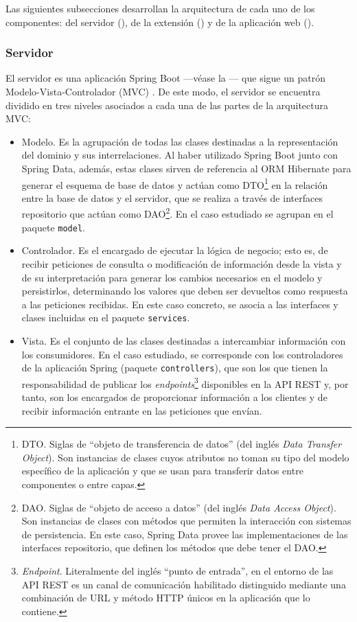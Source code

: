 Las siguientes subsecciones desarrollan la arquitectura de cada uno de los componentes: del servidor (), de la extensión () y de la aplicación web ().

\subsubsection{Servidor}
\label{subsec:arqServidor}
El servidor es una aplicación Spring Boot ---véase la --- que sigue un patrón Modelo-Vista-Controlador (MVC) \cite{Arq_MVCFowler}. De este modo, el servidor se encuentra dividido en tres niveles asociados a cada una de las partes de la arquitectura MVC:
\begin{itemize}
    \item Modelo. Es la agrupación de todas las clases destinadas a la representación del dominio y sus interrelaciones. Al haber utilizado Spring Boot junto con Spring Data, además, estas clases sirven de referencia al ORM Hibernate para generar el esquema de base de datos y actúan como DTO\footnote{DTO. Siglas de ``objeto de transferencia de datos'' (del inglés \textit{Data Transfer Object}). Son instancias de clases cuyos atributos no toman su tipo del modelo específico de la aplicación y que se usan para transferir datos entre componentes o entre capas.} en la relación entre la base de datos y el servidor, que se realiza a través de interfaces repositorio que actúan como DAO\footnote{DAO. Siglas de ``objeto de acceso a datos'' (del inglés \textit{Data Access Object}). Son instancias de clases con métodos que permiten la interacción con sistemas de persistencia. En este caso, Spring Data provee las implementaciones de las interfaces repositorio, que definen los métodos que debe tener el DAO.}. En el caso estudiado se agrupan en el paquete \texttt{model}.
    \item Controlador. Es el encargado de ejecutar la lógica de negocio; esto es, de recibir peticiones de consulta o modificación de información desde la vista y de su interpretación para generar los cambios necesarios en el modelo y persistirlos, determinando los valores que deben ser devueltos como respuesta a las peticiones recibidas. En este caso concreto, se asocia a las interfaces y clases incluidas en el paquete \texttt{services}.
    \item Vista. Es el conjunto de las clases destinadas a intercambiar información con los consumidores. En el caso estudiado, se corresponde con los controladores de la aplicación Spring (paquete \texttt{controllers}), que son los que tienen la responsabilidad de publicar los \textit{endpoints}\footnote{\textit{Endpoint}. Literalmente del inglés ``punto de entrada'', en el entorno de las API REST es un canal de comunicación habilitado distinguido mediante una combinación de URL y método HTTP únicos en la aplicación que lo contiene.} disponibles en la API REST y, por tanto, son los encargados de proporcionar información a los clientes y de recibir información entrante en las peticiones que envían.
\end{itemize}

